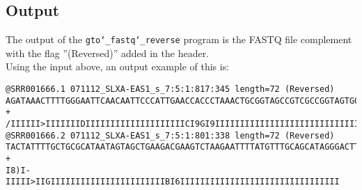 \subsection*{Output}
The output of the \texttt{gto\char`_fastq\char`_reverse} program is the FASTQ file complement with the flag ''(Reversed)'' added in the header.\\
Using the input above, an output example of this is:
\begin{lstlisting}
@SRR001666.1 071112_SLXA-EAS1_s_7:5:1:817:345 length=72 (Reversed)
AGATAAACTTTTGGGAATTCAACAATTCCCATTGAACCACCCTAAACTGCGGTAGCCGTCGCCGGTAGTGGG
+
/IIIIII>IIIIIIIDIIIIIIIIIIIIIIIIIIIICI9GI9IIIIIIIIIIIIIIIIIIIIIIIIIIIIII
@SRR001666.2 071112_SLXA-EAS1_s_7:5:1:801:338 length=72 (Reversed)
TACTATTTTGCTGCGCATAATAGTAGCTGAAGACGAAGTCTAAGAATTTTATGTTTGCAGCATAGGGACTTG
+
I8)I-IIIII>IIGIIIIIIIIIIIIIIIIIIIIIIIBI6IIIIIIIIIIIIIIIIIIIIIIIIIIIIIIII
\end{lstlisting}
